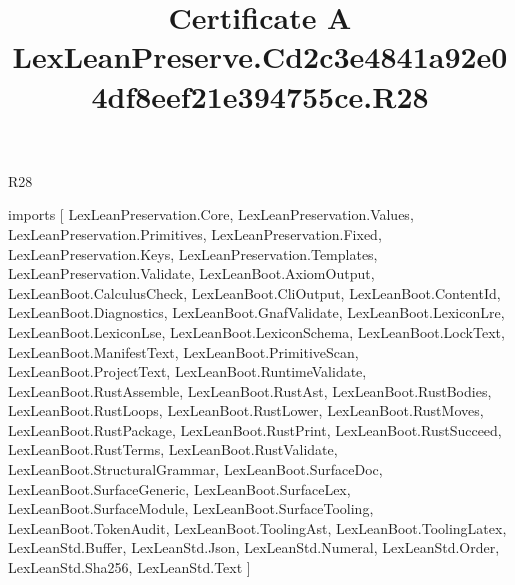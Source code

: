 \begin{lexlean}{R28}
\title{Certificate A LexLeanPreserve.Cd2c3e4841a92e04df8eef21e394755ce.R28}
\begin{coremodule}
imports [
  LexLeanPreservation.Core,
  LexLeanPreservation.Values,
  LexLeanPreservation.Primitives,
  LexLeanPreservation.Fixed,
  LexLeanPreservation.Keys,
  LexLeanPreservation.Templates,
  LexLeanPreservation.Validate,
  LexLeanBoot.AxiomOutput,
  LexLeanBoot.CalculusCheck,
  LexLeanBoot.CliOutput,
  LexLeanBoot.ContentId,
  LexLeanBoot.Diagnostics,
  LexLeanBoot.GnafValidate,
  LexLeanBoot.LexiconLre,
  LexLeanBoot.LexiconLse,
  LexLeanBoot.LexiconSchema,
  LexLeanBoot.LockText,
  LexLeanBoot.ManifestText,
  LexLeanBoot.PrimitiveScan,
  LexLeanBoot.ProjectText,
  LexLeanBoot.RuntimeValidate,
  LexLeanBoot.RustAssemble,
  LexLeanBoot.RustAst,
  LexLeanBoot.RustBodies,
  LexLeanBoot.RustLoops,
  LexLeanBoot.RustLower,
  LexLeanBoot.RustMoves,
  LexLeanBoot.RustPackage,
  LexLeanBoot.RustPrint,
  LexLeanBoot.RustSucceed,
  LexLeanBoot.RustTerms,
  LexLeanBoot.RustValidate,
  LexLeanBoot.StructuralGrammar,
  LexLeanBoot.SurfaceDoc,
  LexLeanBoot.SurfaceGeneric,
  LexLeanBoot.SurfaceLex,
  LexLeanBoot.SurfaceModule,
  LexLeanBoot.SurfaceTooling,
  LexLeanBoot.TokenAudit,
  LexLeanBoot.ToolingAst,
  LexLeanBoot.ToolingLatex,
  LexLeanStd.Buffer,
  LexLeanStd.Json,
  LexLeanStd.Numeral,
  LexLeanStd.Order,
  LexLeanStd.Sha256,
  LexLeanStd.Text
]


\end{coremodule}
\end{lexlean}
